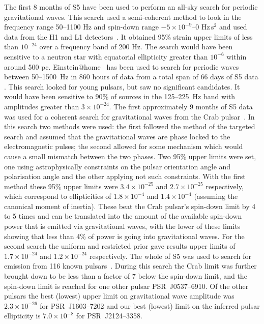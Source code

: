 \documentclass{article}
\begin{document}
The first 8 months of S5 have been used to perform an all-sky search for
periodic gravitational waves. This search used a semi-coherent method to look
in the frequency range 50--1100 Hz and spin-down range $-5\times10^{-9}$--0
Hz\,s$^2$ and used data from the H1 and L1 detectors~\cite{Abbott:2008i}. It
obtained 95\% strain upper limits of less than $10^{-24}$ over a frequency band
of 200 Hz. The search would have been sensitive to a neutron star with
equatorial ellipticity greater than $10^{-6}$ within around 500 pc.
Einstein@home~\cite{eath} has been used to search for periodic waves between
50--1500~Hz in 860 hours of data from a total span of 66 days of S5 data
\cite{Abbott:2009a}. This search looked for young pulsars, but saw no
significant candidates. It would have been sensitive to 90\% of sources in the
125--225~Hz band with amplitudes greater than $3\times10^{-24}$. The first
approximately 9 months of S5 data was used for a coherent search for
gravitational waves from the Crab pulsar~\cite{Abbott:2008j}. In this search two
methods were used: the first followed the method of the targeted search and
assumed that the gravitational waves are phase locked to the electromagnetic
pulses; the second allowed for some mechanism which would cause a small mismatch
between the two phases. Two 95\% upper limits were set, one using
astrophysically
constraints on the pulsar orientation angle and polarisation angle
\cite{Ng:2008}
and the other applying not such constraints. With the first method these 95\%
upper limits were $3.4\times10^{-25}$ and $2.7\times10^{-25}$ respectively,
which correspond to ellipticities of $1.8\times10^{-4}$ and $1.4\times10^{-4}$
(assuming the canonical moment of inertia). These beat the Crab pulsar's
spin-down limit by 4 to 5 times and can be translated into the amount of the
available spin-down power that is emitted via gravitational waves, with the
lower of these limits showing that less than 4\% of power is going into
gravitational waves. For the second search the uniform and restricted prior gave
results upper limits of $1.7\times10^{-24}$ and $1.2\times10^{-24}$
respectively. The whole of S5 was used to search for emission from 116 known
pulsars~\cite{Abbott:2010a}. During this search the Crab limit was further
brought down to be less than a factor of 7 below the spin-down limit, and the
spin-down limit is reached for one other pulsar PSR~J0537--6910. Of the other
pulsars the best (lowest) upper limit on gravitational wave amplitude was
$2.3\times10^{-26}$ for PSR~J1603--7202 and our best (lowest) limit on the
inferred pulsar ellipticity is $7.0\times10^{-8}$ for PSR~J2124--3358.
\end{document}
